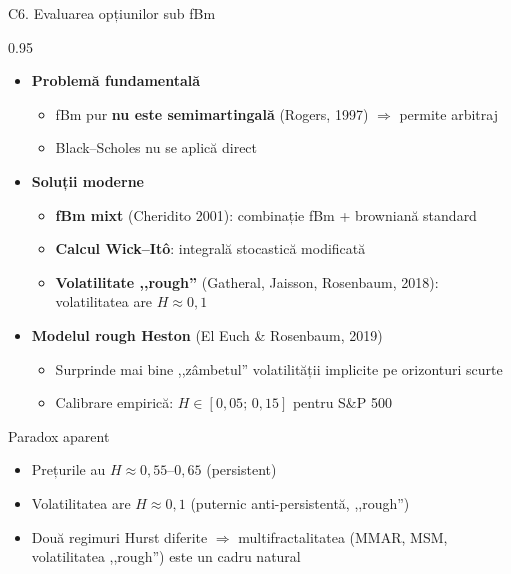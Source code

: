 \documentclass[9pt, aspectratio=169, t]{beamer}
\begin{document}
\begin{frame}[shrink=15]{C6. Evaluarea opțiunilor sub fBm}
\begin{cminipage}{0.95\textwidth}
\begin{itemize}\setlength{\itemsep}{2pt}
    \item \textbf{Problemă fundamentală}
    \begin{itemize}\setlength{\itemsep}{0pt}
        \item fBm pur \textbf{nu este semimartingală} (Rogers, 1997) $\Rightarrow$ permite arbitraj
        \item Black--Scholes nu se aplică direct
    \end{itemize}
    \item \textbf{Soluții moderne}
    \begin{itemize}\setlength{\itemsep}{0pt}
        \item \textbf{fBm mixt} (Cheridito 2001): combinație fBm + browniană standard
        \item \textbf{Calcul Wick--Itô}: integrală stocastică modificată
        \item \textbf{Volatilitate ,,rough''} (Gatheral, Jaisson, Rosenbaum, 2018): volatilitatea are $H\approx 0{,}1$
    \end{itemize}
    \item \textbf{Modelul rough Heston} (El Euch \& Rosenbaum, 2019)
    \begin{itemize}\setlength{\itemsep}{0pt}
        \item Surprinde mai bine ,,zâmbetul'' volatilității implicite pe orizonturi scurte
        \item Calibrare empirică: $H\in[0{,}05;\,0{,}15]$ pentru S\&P 500
    \end{itemize}
\end{itemize}
\begin{alertblock}{Paradox aparent}
\begin{itemize}\setlength{\itemsep}{0pt}
    \item Prețurile au $H\approx 0{,}55$--$0{,}65$ (persistent)
    \item Volatilitatea are $H\approx 0{,}1$ (puternic anti-persistentă, ,,rough'')
    \item Două regimuri Hurst diferite $\Rightarrow$ multifractalitatea (MMAR, MSM, volatilitatea ,,rough'') este un cadru natural
\end{itemize}
\end{alertblock}
\end{cminipage}
\end{frame}
\end{document}
